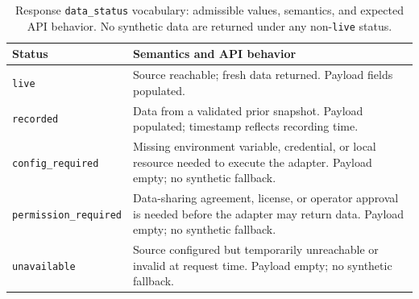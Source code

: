 \begin{table}[t]
\caption{Response \texttt{data\_status} vocabulary: admissible values,
         semantics, and expected API behavior. No synthetic data are
         returned under any non-\texttt{live} status.}
\label{tab:status}
\centering
\renewcommand{\arraystretch}{1.15}
\begin{tabular}{@{}p{3.4cm}p{4.3cm}@{}}
\toprule
\textbf{Status} & \textbf{Semantics and API behavior} \\
\midrule
\texttt{live}
  & Source reachable; fresh data returned. Payload fields populated. \\
\texttt{recorded}
  & Data from a validated prior snapshot. Payload populated; timestamp
    reflects recording time. \\
{\footnotesize\texttt{config\_required}}
  & Missing environment variable, credential, or local resource needed to
    execute the adapter. Payload empty; no synthetic fallback. \\
{\footnotesize\texttt{permission\_required}}
  & Data-sharing agreement, license, or operator approval is needed before
    the adapter may return data. Payload empty; no synthetic fallback. \\
\texttt{unavailable}
  & Source configured but temporarily unreachable or invalid at request
    time. Payload empty; no synthetic fallback. \\
\bottomrule
\end{tabular}
\end{table}

